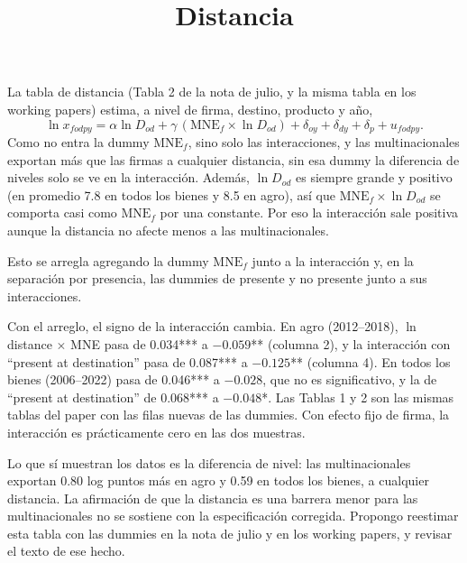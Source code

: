 \documentclass[11pt,a4paper]{article}
\title{Distancia}
\date{}
\begin{document}
\maketitle
\vspace{-2em}

La tabla de distancia (Tabla 2 de la nota de julio, y la misma tabla en los working papers) estima,
a nivel de firma, destino, producto y año,
\[
\ln x_{fodpy} = \alpha \ln D_{od} + \gamma \,(\text{MNE}_f \times \ln D_{od}) + \delta_{oy} + \delta_{dy} + \delta_p + u_{fodpy}.
\]
Como no entra la dummy $\text{MNE}_f$, sino solo las interacciones, y las multinacionales
exportan más que las firmas a cualquier distancia, sin esa dummy la diferencia de niveles solo se
ve en la interacción. Además, $\ln D_{od}$ es siempre grande y positivo (en promedio 7.8 en todos
los bienes y 8.5 en agro), así que $\text{MNE}_f \times \ln D_{od}$ se comporta casi como
$\text{MNE}_f$ por una constante. Por eso la interacción sale positiva aunque la distancia no
afecte menos a las multinacionales.

Esto se arregla agregando la dummy $\text{MNE}_f$ junto a la interacción y, en la separación por
presencia, las dummies de presente y no presente junto a sus interacciones.

Con el arreglo, el signo de la interacción cambia. En agro (2012--2018), $\ln$ distance $\times$
MNE pasa de 0.034*** a $-0.059$** (columna 2), y la interacción con ``present at destination'' pasa
de 0.087*** a $-0.125$** (columna 4). En todos los bienes (2006--2022) pasa de 0.046*** a $-0.028$,
que no es significativo, y la de ``present at destination'' de 0.068*** a $-0.048$*. Las Tablas 1 y
2 son las mismas tablas del paper con las filas nuevas de las dummies. Con efecto fijo de firma, la
interacción es prácticamente cero en las dos muestras.

Lo que sí muestran los datos es la diferencia de nivel: las multinacionales exportan 0.80 log
puntos más en agro y 0.59 en todos los bienes, a cualquier distancia. La afirmación de que la
distancia es una barrera menor para las multinacionales no se sostiene con la especificación
corregida. Propongo reestimar esta tabla con las dummies en la nota de julio y en los working
papers, y revisar el texto de ese hecho.
\end{document}
